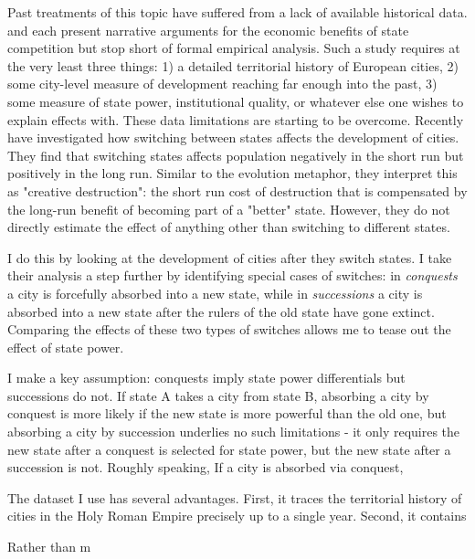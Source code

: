 \documentclass{article}
\begin{document}
Past treatments of this topic have suffered from a lack of available historical data. \cite{diamond1997} and \cite{landes2006} each present narrative arguments for the economic benefits of state competition but stop short of formal empirical analysis. Such a study requires at the very least three things: 1) a detailed territorial history of European cities, 2) some city-level measure of development reaching far enough into the past, 3) some measure of state power, institutional quality, or whatever else one wishes to explain effects with.
These data limitations are starting to be overcome. Recently \cite{schoenholzer2022} have investigated how switching between states affects the development of cities. They find that switching states affects population negatively in the short run but positively in the long run. Similar to the evolution metaphor, they interpret this as "creative destruction": the short run cost of destruction that is compensated by the long-run benefit of becoming part of a "better" state.
However, they do not directly estimate the effect of anything other than switching to different states.



I do this by looking at the development of cities after they switch states. I take their analysis a step further by identifying special cases of switches: in \textit{conquests} a city is forcefully absorbed into a new state, while in \textit{successions} a city is absorbed into a new state after the rulers of the old state have gone extinct. Comparing the effects of these two types of switches allows me to tease out the effect of state power.

I make a key assumption: conquests imply state power differentials but successions do not. If state A takes a city from state B, 
absorbing a city by conquest is more likely if the new state is more powerful than the old one, but absorbing a city by succession underlies no such limitations - it only requires 
the new state after a conquest is selected for state power, but the new state after a succession is not. Roughly speaking, 
If a city is absorbed via conquest, 







The dataset I use has several advantages. First, it traces the territorial history of cities in the Holy Roman Empire precisely up to a single year. Second, it contains 

Rather than m
\end{document}

